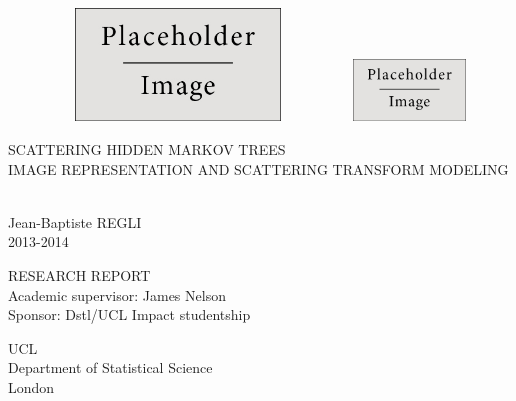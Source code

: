 \documentclass[a4paper,11pt]{report}
\begin{document}
	\begin{titlepage}
		\hspace{-1.5cm}\includegraphics[width=9cm,height= 3cm]{placeholder.jpg}
		\hfill{
		  \raggedleft \includegraphics[width=3cm]{placeholder.jpg}
		}
		\vspace*{5cm}
	
		\begin{center}
			\begin{sc} 	
				\huge SCATTERING HIDDEN MARKOV TREES
				\vspace*{0.2cm}
				\\ \large IMAGE REPRESENTATION AND SCATTERING TRANSFORM MODELING
				\vspace*{2cm}
			\end{sc}
			\\ \LARGE Jean-Baptiste REGLI
			\vspace*{0.2cm}
			\\ \large 2013-2014
		\end{center}

		\vfill
		\begin{center}
			\vspace*{1cm}
			\Large RESEARCH REPORT
			\vspace*{0.5cm}
			\\ \large Academic supervisor: James Nelson 
			\\ \large Sponsor: Dstl/UCL Impact studentship
			
			\vspace*{1cm}
			\Large UCL
			\\ \normalsize Department of Statistical Science
			\\ London
		\end{center}
	\end{titlepage}
	\clearpage
\end{document}
